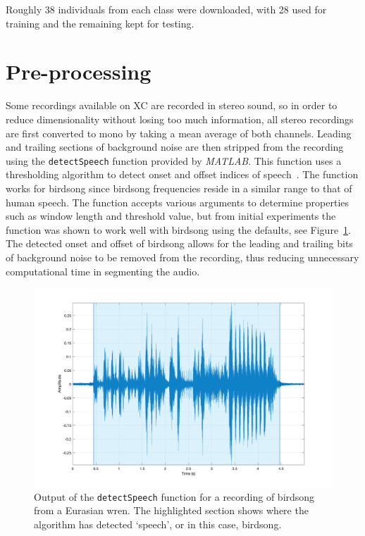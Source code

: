 Roughly 38 individuals from each class were downloaded, with 28 used for
training and the remaining kept for testing.

\section{Pre-processing}

Some recordings available on XC are recorded in stereo sound, so in order to
reduce dimensionality without losing too much information, all stereo recordings
are first converted to mono by taking a mean average of both channels. Leading
and trailing sections of background noise are then stripped from the recording
using the \texttt{detectSpeech} function provided by \textit{MATLAB}. This
function uses a thresholding algorithm to detect onset and offset indices of
speech~\cite{giannakopoulos2009method}. The function works for birdsong since
birdsong frequencies reside in a similar range to that of human speech. The
function accepts various arguments to determine properties such as window length
and threshold value, but from initial experiments the function was shown to
work well with birdsong using the defaults, see Figure~\ref{fig:detected_speech}.
The detected onset and offset of birdsong allows for the leading and trailing
bits of background noise to be removed from the recording, thus reducing
unnecessary computational time in segmenting the audio.

\begin{figure}[ht]
  \centering
  \includegraphics[width=\textwidth]{figures/detected_speech.png}
  \caption{Output of the \texttt{detectSpeech} function for a recording of
  birdsong from a Eurasian wren. The highlighted section shows where the
algorithm has detected `speech', or in this case,
birdsong.}\label{fig:detected_speech}
\end{figure}


